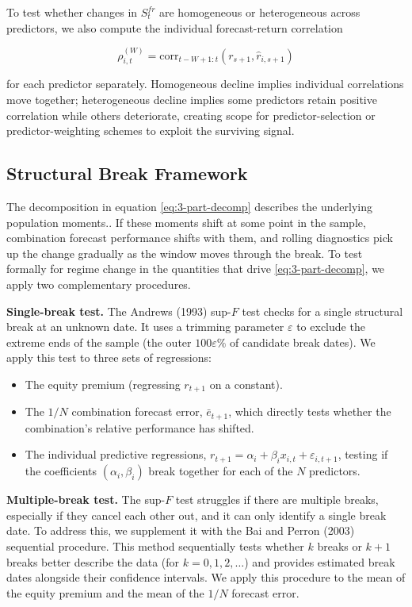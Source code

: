 \documentclass[a4paper,11pt]{article}
\begin{document}
To test whether changes in $S^{fr}_t$ are homogeneous or heterogeneous across predictors, we also compute the individual forecast-return correlation

\begin{equation}
\rho_{i,t}^{(W)} = \mathrm{corr}_{t-W+1:t}(r_{s+1}, \hat{r}_{i,s+1}) \label{eq:9}
\end{equation}

for each predictor separately. Homogeneous decline implies individual correlations move together; heterogeneous decline implies some predictors retain positive correlation while others deteriorate, creating scope for predictor-selection or predictor-weighting schemes to exploit the surviving signal.

\subsection{Structural Break Framework}

The decomposition in equation \eqref{eq:3-part-decomp} describes the underlying population moments.. If these moments shift at some point in the sample, combination forecast performance shifts with them, and rolling diagnostics pick up the change gradually as the window moves through the break. To test formally for regime change in the quantities that drive \ref{eq:3-part-decomp}, we apply two complementary procedures.

\textbf{Single-break test.} The Andrews (1993) sup-$F$ test checks for a single structural break at an unknown date. It uses a trimming parameter $\varepsilon$ to exclude the extreme ends of the sample (the outer $100\varepsilon\%$ of candidate break dates). We apply this test to three sets of regressions:
\begin{itemize}
    \item The equity premium (regressing $r_{t+1}$ on a constant).
    \item The $1/N$ combination forecast error, $\bar{e}_{t+1}$, which directly tests whether the combination's relative performance has shifted.
    \item The individual predictive regressions, $r_{t+1} = \alpha_i + \beta_i x_{i,t} + \varepsilon_{i,t+1}$, testing if the coefficients $(\alpha_i, \beta_i)$ break together for each of the $N$ predictors.
\end{itemize}

\textbf{Multiple-break test.} The sup-$F$ test struggles if there are multiple breaks, especially if they cancel each other out, and it can only identify a single break date. To address this, we supplement it with the Bai and Perron (2003) sequential procedure. This method sequentially tests whether $k$ breaks or $k+1$ breaks better describe the data (for $k = 0, 1, 2, \ldots$) and provides estimated break dates alongside their confidence intervals. We apply this procedure to the mean of the equity premium and the mean of the $1/N$ forecast error.
\end{document}
